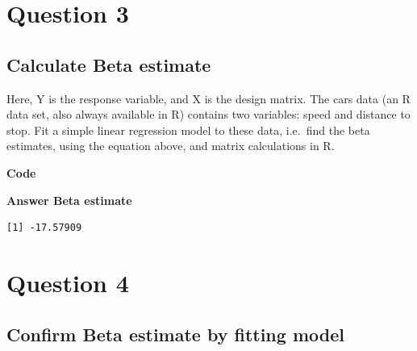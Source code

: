 \documentclass[
  letterpaper,
]{book}
\newenvironment{Shaded}{\begin{snugshade}}{\end{snugshade}}
\newcommand{\DecValTok}[1]{\textcolor[rgb]{0.68,0.00,0.00}{#1}}
\newcommand{\DocumentationTok}[1]{\textcolor[rgb]{0.37,0.37,0.37}{\textit{#1}}}
\newcommand{\FunctionTok}[1]{\textcolor[rgb]{0.28,0.35,0.67}{#1}}
\newcommand{\NormalTok}[1]{\textcolor[rgb]{0.00,0.23,0.31}{#1}}
\newcommand{\OtherTok}[1]{\textcolor[rgb]{0.00,0.23,0.31}{#1}}
\newcommand{\SpecialCharTok}[1]{\textcolor[rgb]{0.37,0.37,0.37}{#1}}
\begin{document}
\chapter{Question 3}\label{question-3}

\section{Calculate Beta estimate}\label{calculate-beta-estimate}

Here, Y is the response variable, and X is the design matrix. The cars
data (an R data set, also always available in R) contains two variables:
speed and distance to stop. Fit a simple linear regression model to
these data, i.e.~find the beta estimates, using the equation above, and
matrix calculations in R.

\textbf{Code}

\begin{Shaded}
\end{Shaded}

\textbf{Answer Beta estimate}

\begin{verbatim}
[1] -17.57909
\end{verbatim}


\chapter{Question 4}\label{question-4}

\section{Confirm Beta estimate by fitting
model}\label{confirm-beta-estimate-by-fitting-model}
\end{document}
